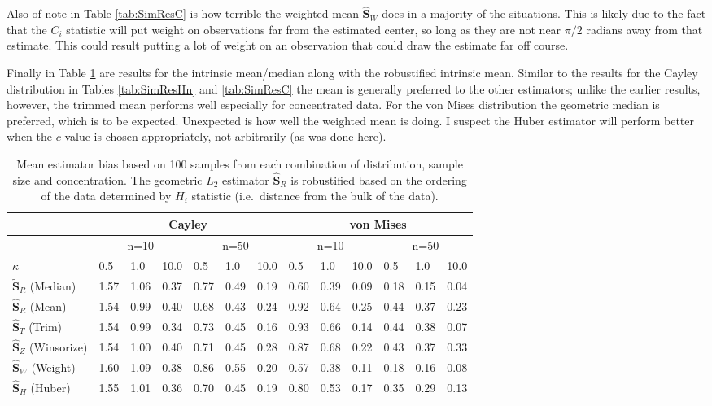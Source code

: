 \documentclass{article}\usepackage[]{graphicx}\usepackage[]{color}
\newcommand{\GeomMean}{{\widehat{\bm S}_{R}}}
\newcommand{\GeomMedian}{{\widetilde{\bm S}_{R}}}
\newcommand{\HuberMean}{{\widehat{\bm S}_H}}
\newcommand{\WeightMean}{{\widehat{\bm S}_W}}
\newcommand{\TrimMean}{{\widehat{\bm S}_T}}
\newcommand{\WinzMean}{{\widehat{\bm S}_Z}}
\newcommand{\red}[1]{{\color{red} #1}}
\begin{document}
Also of note in Table \ref{tab:SimResC} is how terrible the weighted mean $\WeightMean$ does in a majority of the situations.  This is likely due to the fact that the $C_i$ statistic will put weight on observations far from the estimated center, so long as they are not near $\pi/2$ radians away from that estimate.  This could result putting a lot of weight on an observation that could draw the estimate far off course.

Finally in Table \ref{tab:SimResHnIntrin} are results for the intrinsic mean/median along with the robustified intrinsic mean. Similar to the results for the Cayley distribution in Tables \ref{tab:SimResHn} and \ref{tab:SimResC} the mean is generally preferred to the other estimators; unlike the earlier results, however, the trimmed mean performs well especially for concentrated data.  For the von Mises distribution the geometric median is preferred, which is to be expected.  Unexpected is how well the weighted mean is doing.  I suspect the Huber estimator will perform better when the $c$ value is chosen appropriately, not arbitrarily (as was done here).

\begin{table}[ht]
\centering
\begin{tabular}{l|lll|lll|lll|lll}
  \hline
 & \multicolumn{6}{|c|}{Cayley} & \multicolumn{6}{|c}{von Mises}   \\ 
\hline
   &  \multicolumn{3}{|c|}{n=10} & \multicolumn{3}{|c|}{n=50} & \multicolumn{3}{|c|}{n=10} & \multicolumn{3}{|c}{n=50} \\
  $\kappa$ &  0.5 &  1.0 & 10.0 &  0.5 &  1.0 & 10.0 &  0.5 &  1.0 & 10.0 &  0.5 &  1.0 & 10.0 \\ \hline
 $\GeomMedian$ (Median) & 1.57 & 1.06 & 0.37 & 0.77 & 0.49 & 0.19 & 0.60 & 0.39 & \red{0.09} & \red{0.18} & \red{0.15} & \red{0.04} \\ 
 $\GeomMean$ (Mean) & \red{1.54} & \red{0.99} & 0.40 & \red{0.68} & \red{0.43} & 0.24 & 0.92 & 0.64 & 0.25 & 0.44 & 0.37 & 0.23 \\ 
 $\TrimMean$ (Trim) & \red{1.54} & \red{0.99} & \red{0.34} & 0.73 & 0.45 & \red{0.16} & 0.93 & 0.66 & 0.14 & 0.44 & 0.38 & 0.07 \\ 
 $\WinzMean$ (Winsorize) & \red{1.54} & 1.00 & 0.40 & 0.71 & 0.45 & 0.28 & 0.87 & 0.68 & 0.22 & 0.43 & 0.37 & 0.33 \\ 
 $\WeightMean$ (Weight) & 1.60 & 1.09 & 0.38 & 0.86 & 0.55 & 0.20 & \red{0.57} & \red{0.38} & 0.11 & \red{0.18} & 0.16 & 0.08 \\ 
 $\HuberMean$ (Huber) & 1.55 & 1.01 & 0.36 & 0.70 & 0.45 & 0.19 & 0.80 & 0.53 & 0.17 & 0.35 & 0.29 & 0.13 \\ 
   \hline
\end{tabular}
\caption{Mean estimator bias based on 100 samples from each combination of distribution, sample size and concentration.  The geometric $L_2$ estimator $\GeomMean$ is robustified based on the ordering of the data determined by $H_i$ statistic (i.e.~distance from the bulk of the data).}
\label{tab:SimResHnIntrin}
\end{table}




\clearpage
%

\end{document}
